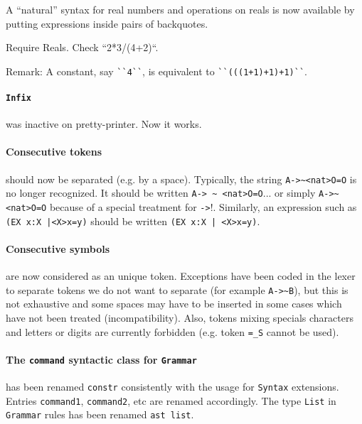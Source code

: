 \documentclass[11pt]{article}
\begin{document}
A ``natural'' syntax for real numbers and operations on reals is now
available by putting expressions inside pairs of backquotes.

\begin{coq_example}
Require Reals.
Check ``2*3/(4+2)``.
\end{coq_example}

Remark: A constant, say \verb:``4``:, is equivalent to
\verb:``(((1+1)+1)+1)``:.

\paragraph{{\tt Infix}} was inactive on pretty-printer. Now it works.

\paragraph{Consecutive tokens} should now be separated (e.g. by a
space). Typically, the string \verb:A->~<nat>O=O: is no longer
recognized. It should be written \verb:A-> ~ <nat>O=O:... or simply
\verb:A->~ <nat>O=O: because of a special treatment for \verb:->:!.
Similarly, an expression such as \verb!(EX x:X |<X>x=y)! should be
written \verb!(EX x:X | <X>x=y)!.

\paragraph{Consecutive symbols} are now considered as an unique token.
Exceptions have been coded in the lexer to separate tokens we do not want to
separate (for example \verb:A->~B:), but this is not exhaustive and some spaces
may have to be inserted in some cases which have not been treated
(incompatibility).
Also, tokens mixing specials characters and letters or digits
are currently forbidden (e.g. token \verb:=_S: cannot be used).


\paragraph{The {\tt command} syntactic class for {\tt Grammar}} has
been renamed {\tt constr} consistently with the usage for {\tt Syntax}
extensions. Entries {\tt command1}, {\tt command2}, etc are renamed
accordingly. The type {\tt List} in {\tt Grammar} rules has been
renamed {\tt ast list}.
\end{document}
